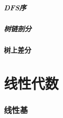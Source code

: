 \documentclass[12pt,a4paper]{article}
\begin{document}
\subsubsection{DFS序}
\subsubsection{树链剖分}
\subsection{树上差分}
\newpage
\part{线性代数}
\section{线性基}
\end{document}
